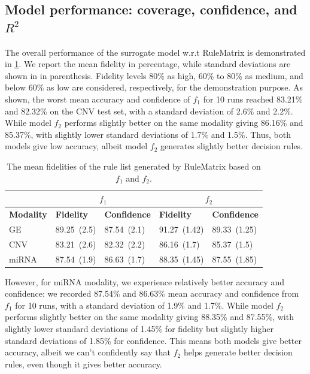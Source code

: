\subsection{Model performance: coverage, confidence, and $R^2$}
The overall performance of the surrogate model w.r.t RuleMatrix is demonstrated in \cref{table:rules_overall_result}. We report the mean fidelity in percentage, while standard deviations are shown in in parenthesis. Fidelity levels 80\% as high, 60\% to 80\% as medium, and below 60\% as low are considered, respectively, for the demonstration purpose. As shown, the worst mean accuracy and confidence of $f_1$ for 10 runs reached 83.21\% and 82.32\% on the CNV test set, with a standard deviation of 2.6\% and 2.2\%. While model $f_2$ performs slightly better on the same modality giving 86.16\% and 85.37\%, with slightly lower standard deviations of 1.7\% and 1.5\%. Thus, both models give low accuracy, albeit model $f_2$ generates slightly better decision rules. 

\begin{table}[h!]
    \centering
    \caption{The mean fidelities of the rule list generated by RuleMatrix based on $f_1$ and $f_2$.}
    \label{table:rules_overall_result}
    \vspace{-2mm}
    \scriptsize{
    \begin{tabular}{l|l|l|l|l} 
        \hline
         & \multicolumn{2}{c|}{$f_1$} & \multicolumn{2}{c}{$f_2$} \\ 
        \hline
        \textbf{Modality} & \textbf{Fidelity} & \textbf{Confidence} & \textbf{Fidelity} & \textbf{Confidence} \\ 
        \hline
        GE  & 89.25~(2.5) & 87.54~(2.1) & 91.27~(1.42) & 89.33~(1.25) \\ 
        \cline{1-3}\cline{4-5}
        CNV & 83.21~(2.6) & 82.32~(2.2) & 86.16~(1.7) & 85.37~(1.5) \\ 
        \hline
        miRNA & 87.54~(1.9) & 86.63~(1.7) & 88.35~(1.45) & 87.55~(1.85) \\
        \hline
    \end{tabular}}
    \vspace{-4mm}
\end{table}

However, for miRNA modality, we experience relatively better accuracy and confidence: we recorded 87.54\% and 86.63\% mean accuracy and confidence from $f_1$ for 10 runs, with a standard deviation of 1.9\% and 1.7\%. While model $f_2$ performs slightly better on the same modality giving 88.35\% and 87.55\%, with slightly lower standard deviations of 1.45\% for fidelity but slightly higher standard deviations of 1.85\% for confidence. This means both models give better accuracy, albeit we can't confidently say that $f_2$ helps generate better decision rules, even though it gives better accuracy. 

